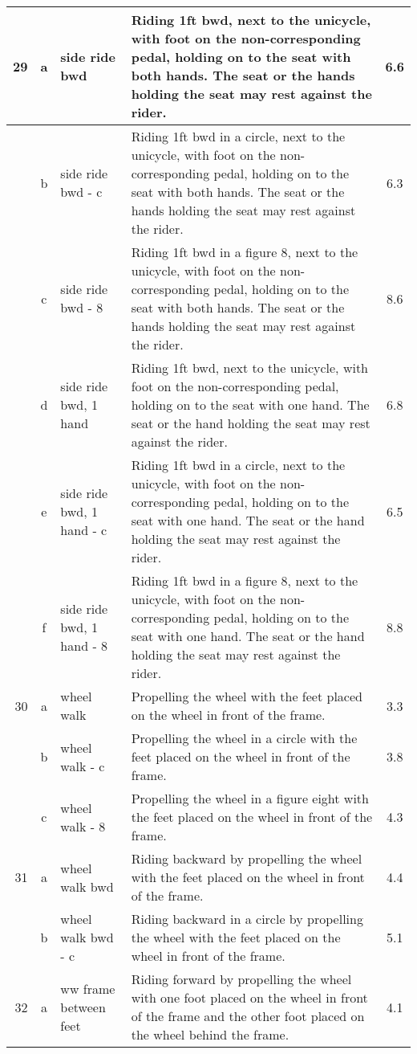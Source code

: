 \begin{longtable}{|r|c|p{4cm}|p{8cm}|c|}
\hline
29  & a & side ride bwd & Riding 1ft bwd, next to the unicycle, with foot on the non-corresponding pedal, holding on to the seat with both hands. The seat or the hands holding the seat may rest against the rider.  & 6.6 \\ 
\hline
  & b & side ride bwd - c & Riding 1ft bwd in a circle, next to the unicycle, with foot on the non-corresponding pedal, holding on to the seat with both hands. The seat or the hands holding the seat may rest against the rider.  & 6.3 \\ 
\hline
  & c & side ride bwd - 8 & Riding 1ft bwd in a figure 8, next to the unicycle, with foot on the non-corresponding pedal, holding on to the seat with both hands. The seat or the hands holding the seat may rest against the rider.  & 8.6 \\ 
\hline
  & d & side ride bwd, 1 hand & Riding 1ft bwd, next to the unicycle, with foot on the non-corresponding pedal, holding on to the seat with one hand. The seat or the hand holding the seat may rest against the rider. & 6.8 \\ 
\hline
  & e & side ride bwd, 1 hand - c & Riding 1ft bwd in a circle, next to the unicycle, with foot on the non-corresponding pedal, holding on to the seat with one hand. The seat or the hand holding the seat may rest against the rider. & 6.5 \\ 
\hline
  & f & side ride bwd, 1 hand - 8 & Riding 1ft bwd in a figure 8, next to the unicycle, with foot on the non-corresponding pedal, holding on to the seat with one hand. The seat or the hand holding the seat may rest against the rider. & 8.8 \\ 
\hline
30  & a & wheel walk  & Propelling the wheel with the feet placed on the wheel in front of the frame. & 3.3 \\ 
\hline
  & b & wheel walk - c  & Propelling the wheel in a circle with the feet placed on the wheel in front of the frame. & 3.8 \\ 
\hline
  & c & wheel walk - 8  & Propelling the wheel in a figure eight with the feet placed on the wheel in front of the frame. & 4.3 \\ 
\hline
31  & a & wheel walk bwd  & Riding backward by propelling the wheel with the feet placed on the wheel in front of the frame.  & 4.4 \\ 
\hline
  & b & wheel walk bwd - c  & Riding backward in a circle by propelling the wheel with the feet placed on the wheel in front of the frame.  & 5.1 \\ 
\hline
32  & a & ww frame between feet & Riding forward by propelling the wheel with one foot placed on the wheel in front of the frame and the other foot placed on the wheel behind the frame. & 4.1 \\ 

\end{longtable}
